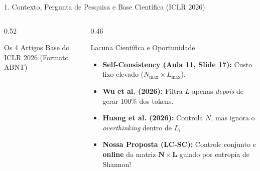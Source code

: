 \documentclass[aspectratio=169,10pt]{beamer}
\begin{document}
\begin{frame}{1. Contexto, Pergunta de Pesquisa e Base Científica (ICLR 2026)}
\begin{columns}[T]
\begin{column}{0.52\textwidth}
\begin{exampleblock}{\footnotesize Os 4 Artigos Base do ICLR 2026 (Formato ABNT)}
\end{exampleblock}
\end{column}
\begin{column}{0.46\textwidth}
\begin{alertblock}{\footnotesize Lacuna Científica e Oportunidade}
\scriptsize
\begin{itemize}
    \item \textbf{Self-Consistency (Aula 11, Slide 17):} Custo fixo elevado ($N_{\max} \times L_{\max}$).
    \item \textbf{Wu et al. (2026):} Filtra $L$ apenas \textit{depois} de gerar 100\% dos tokens.
    \item \textbf{Huang et al. (2026):} Controla $N$, mas ignora o \textit{overthinking} dentro de $L_i$.
    \item \textbf{Nossa Proposta (LC-SC):} Controle conjunto e \textbf{online} da matriz $\mathbf{N \times L}$ guiado por entropia de Shannon!
\end{itemize}
\end{alertblock}
\end{column}
\end{columns}
\end{frame}
\end{document}
